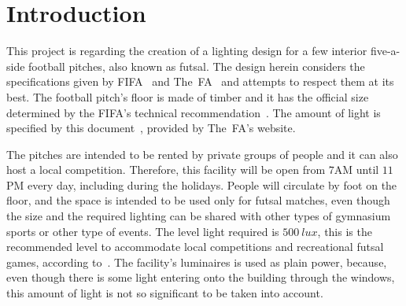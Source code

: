 \chapter*{Introduction}

This project is regarding the creation of a lighting design for a few interior five-a-side football pitches, also known as futsal. The design herein considers the specifications given by FIFA~\cite{www:fifa_official} and The~FA~\cite{www:the_fa_official} and attempts to respect them at its best. The football pitch's floor is made of timber and it has the official size determined by the FIFA's technical recommendation~\cite{www:fifa_book_spec}. The amount of light is specified by this document~\cite{www:the_fa_guide}, provided by The~FA's website.

The pitches are intended to be rented by private groups of people and it can also host a local competition. Therefore, this facility will be open from $7$AM until $11$PM every day, including during the holidays. People will circulate by foot on the floor, and the space is intended to be used only for futsal matches, even though the size and the required lighting can be shared with other types of gymnasium sports or other type of events. The level light required is $500\: lux$, this is the recommended level to accommodate local competitions and recreational futsal games, according to~\cite{www:the_fa_guide}. The facility's luminaires is used as plain power, because, even though there is some light entering onto the building through the windows, this amount of light is not so significant to be taken into account.

